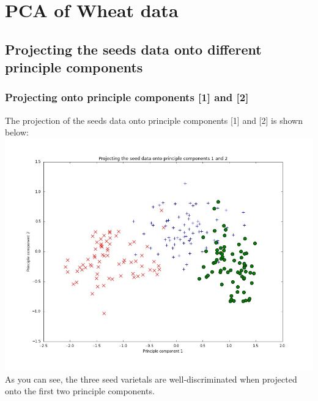 \documentclass[paper=a4, fontsize=11pt]{scrartcl} %
\numberwithin{equation}{section} %
\numberwithin{figure}{section} %
\numberwithin{table}{section} %
\begin{document}

\section{PCA of Wheat data}

\subsection{Projecting the seeds data onto different principle components}

\subsubsection{Projecting onto principle components [1] and [2]}
The projection of the seeds data onto principle components [1] and [2] is shown below:
\includegraphics[scale = 0.5]{q4_ai.jpg}
As you can see, the three seed varietals are well-discriminated when projected onto the first two principle components.
\end{document}
